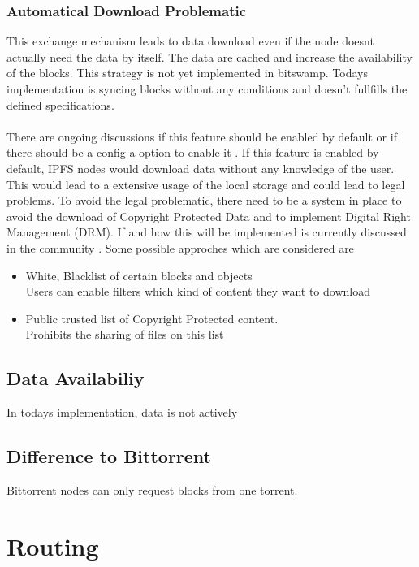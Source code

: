 \documentclass[a4paper,11pt, oneside]{report}
\theoremstyle{definition}
\begin{document}
\subsubsection{Automatical Download Problematic}
This exchange mechanism leads to data download even if the node doesnt actually need the data by itself. The data are cached and increase the availability of the blocks. This strategy is not yet implemented in bitswamp. Todays implementation is syncing blocks without any conditions and doesn't fullfills the defined specifications.\\ \\ 
There are ongoing discussions if this feature should be enabled by default or if there should be a config a option to enable it \cite{bitswapstrategy}. If this feature is enabled by default, IPFS nodes would download data without any knowledge of the user. This would lead to a extensive usage of the local storage and could lead to legal problems. To avoid the legal problematic, there need to be a system in place to avoid the download of Copyright Protected Data and to implement Digital Right Management (DRM). If and how this will be implemented is currently discussed in the community \cite{copyright}. Some possible approches which are considered are 
\begin{itemize}
\item White, Blacklist of certain blocks and objects\\ Users can enable filters which kind of content they want to download
\item Public trusted list of Copyright Protected content. \\ Prohibits the sharing of files on this list
\end{itemize}


\newpage
\subsection{Data Availabiliy}
In todays implementation, data is not actively 

\subsection{Difference to Bittorrent}

Bittorrent nodes can only request blocks from one torrent.


\section{Routing}
\end{document}
